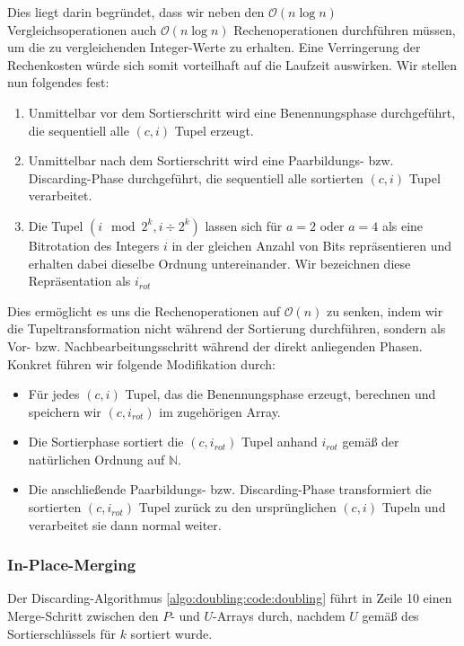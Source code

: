 Dies liegt darin begründet, dass wir neben den $\mathcal{O}(n \log n)$ Vergleichsoperationen auch $\mathcal{O}(n \log n)$ Rechenoperationen durchführen müssen, um die zu vergleichenden Integer-Werte zu erhalten. Eine Verringerung der Rechenkosten würde sich somit vorteilhaft auf die Laufzeit auswirken. Wir stellen nun folgendes fest:

\begin{enumerate}
\item Unmittelbar vor dem Sortierschritt wird eine Benennungsphase durchgeführt, die sequentiell alle $(c, i)$ Tupel erzeugt.
\item Unmittelbar nach dem Sortierschritt wird eine Paarbildungs- bzw. Discarding-Phase durchgeführt, die sequentiell alle sortierten $(c, i)$ Tupel verarbeitet.
\item Die Tupel $(i \mod 2^k, i \div 2^k)$ lassen sich für $a = 2$ oder $a = 4$ als eine Bitrotation des Integers $i$ in der gleichen Anzahl von Bits repräsentieren und erhalten dabei dieselbe Ordnung untereinander. Wir bezeichnen diese Repräsentation als $i_{rot}$
\end{enumerate}

Dies ermöglicht es uns die Rechenoperationen auf $\mathcal{O}(n)$ zu senken, indem wir die Tupeltransformation nicht während der Sortierung durchführen, sondern als Vor- bzw. Nachbearbeitungsschritt während der direkt anliegenden Phasen. Konkret führen wir folgende Modifikation durch:

\begin{itemize}
\item Für jedes $(c, i)$ Tupel, das die Benennungsphase erzeugt, berechnen und speichern wir $(c, i_{rot})$ im zugehörigen Array.
\item Die Sortierphase sortiert die $(c, i_{rot})$ Tupel anhand $i_{rot}$ gemäß der natürlichen Ordnung auf $\mathbb{N}$.
\item Die anschließende Paarbildungs- bzw. Discarding-Phase transformiert die sortierten $(c, i_{rot})$ Tupel zurück zu den ursprünglichen $(c, i)$ Tupeln und verarbeitet sie dann normal weiter.
\end{itemize}

\subsubsection{In-Place-Merging}

Der Discarding-Algorithmus \ref{algo:doubling:code:doubling} führt in Zeile 10 einen Merge-Schritt zwischen den $P$- und $U$-Arrays durch, nachdem $U$ gemäß des Sortierschlüssels für $k$ sortiert wurde. 


